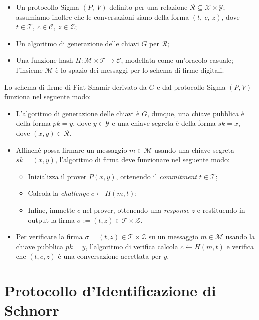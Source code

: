 \begin{itemize}
    \item Un protocollo Sigma $(P,\ V)$ definito per una relazione $\mathcal{R} \subseteq \mathcal{X} \times \mathcal{Y}$; assumiamo inoltre che le conversazioni siano della forma $(t,\ c,\ z)$, dove $t \in \mathcal{T},\ c \in \mathcal{C},\ z \in \mathcal{Z}$;
    \item Un algoritmo di generazione delle chiavi $G$ per $\mathcal{R}$;
    \item Una funzione hash $H: \mathcal{M} \times \mathcal{T} \rightarrow \mathcal{C}$, modellata come un'oracolo casuale; l'insieme $\mathcal{M}$ è lo spazio dei messaggi per lo schema di firme digitali.
\end{itemize}

Lo schema di firme di Fiat-Shamir derivato da $G$ e dal protocollo Sigma $(P, V)$ funziona nel seguente modo:

\begin{itemize}
    \item L'algoritmo di generazione delle chiavi è $G$, dunque, una chiave pubblica è della forma $pk = y$, dove $y \in \mathcal{Y}$ e una chiave segreta è della forma $sk = x$, dove $(x, y) \in \mathcal{R}$.
    \item Affinché possa firmare un messaggio $m \in \mathcal{M}$ usando una chiave segreta $sk = (x, y)$, l'algoritmo di firma deve funzionare nel seguente modo:
    \begin{itemize}
        \item Inizializza il prover $P(x, y)$, ottenendo il \textit{commitment} $t \in \mathcal{T}$;
        \item Calcola la \textit{challenge} $c \leftarrow H(m, t)$;
        \item Infine, immette $c$ nel prover, ottenendo una \textit{response} $z$ e restituendo in output la firma $\sigma := (t, z) \in \mathcal{T} \times \mathcal{Z}$. 
    \end{itemize}
    \item Per verificare la firma $\sigma = (t, z) \in \mathcal{T} \times \mathcal{Z}$ su un messaggio $m \in \mathcal{M}$ usando la chiave pubblica $pk = y$, l'algoritmo di verifica calcola $c \leftarrow H(m, t)$ e verifica che $(t, c, z)$ è una conversazione accettata per $y$.
\end{itemize}

\section{Protocollo d'Identificazione di Schnorr}\label{sec:schnorr}

